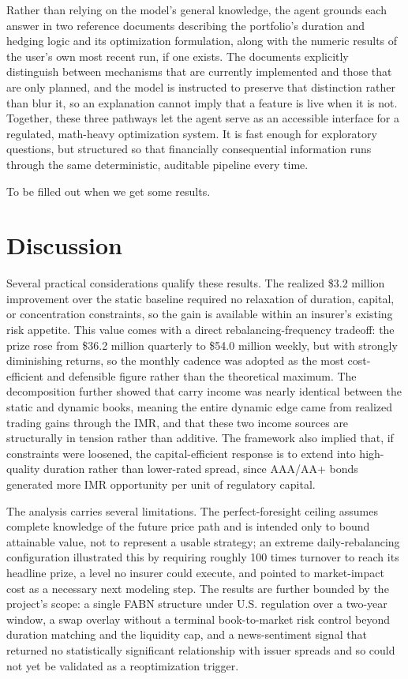 \documentclass[12pt]{article}
\begin{document}
Rather than relying on the model's general knowledge, the agent grounds each answer in two reference documents describing the portfolio's duration and hedging logic and its optimization formulation, along with the numeric results of the user's own most recent run, if one exists. The documents explicitly distinguish between mechanisms that are currently implemented and those that are only planned, and the model is instructed to preserve that distinction rather than blur it, so an explanation cannot imply that a feature is live when it is not. Together, these three pathways let the agent serve as an accessible interface for a regulated, math-heavy optimization system. It is fast enough for exploratory questions, but structured so that financially consequential information runs through the same deterministic, auditable pipeline every time.


To be filled out when we get some results.

\section{Discussion}

Several practical considerations qualify these results. The realized \$3.2 million improvement over the static baseline required no relaxation of duration, capital, or concentration constraints, so the gain is available within an insurer's existing risk appetite. This value comes with a direct rebalancing-frequency tradeoff: the prize rose from \$36.2 million quarterly to \$54.0 million weekly, but with strongly diminishing returns, so the monthly cadence was adopted as the most cost-efficient and defensible figure rather than the theoretical maximum. The decomposition further showed that carry income was nearly identical between the static and dynamic books, meaning the entire dynamic edge came from realized trading gains through the IMR, and that these two income sources are structurally in tension rather than additive. The framework also implied that, if constraints were loosened, the capital-efficient response is to extend into high-quality duration rather than lower-rated spread, since AAA/AA+ bonds generated more IMR opportunity per unit of regulatory capital.

The analysis carries several limitations. The perfect-foresight ceiling assumes complete knowledge of the future price path and is intended only to bound attainable value, not to represent a usable strategy; an extreme daily-rebalancing configuration illustrated this by requiring roughly 100 times turnover to reach its headline prize, a level no insurer could execute, and pointed to market-impact cost as a necessary next modeling step. The results are further bounded by the project's scope: a single FABN structure under U.S. regulation over a two-year window, a swap overlay without a terminal book-to-market risk control beyond duration matching and the liquidity cap, and a news-sentiment signal that returned no statistically significant relationship with issuer spreads and so could not yet be validated as a reoptimization trigger.
\end{document}
